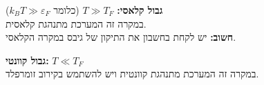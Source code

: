 \begin{cheatformula}
\textbf{גבול קלאסי:} $T \gg T_F$ (כלומר $k_BT \gg \varepsilon_F$) \\
במקרה זה המערכת מתנהגת קלאסית. \\
\textbf{חשוב:} יש לקחת בחשבון את התיקון של גיבס במקרה הקלאסי.

\textbf{גבול קוונטי:} $T \ll T_F$ \\
במקרה זה המערכת מתנהגת קוונטית ויש להשתמש בקירוב זומרפלד.
\end{cheatformula}